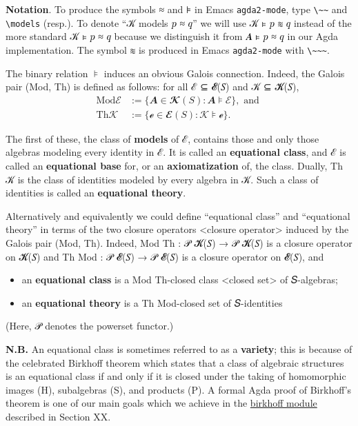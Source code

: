 \documentclass[sigplan,screen]{acmart}
\newcommand\birkhoffmodule{\href{https://gitlab.com/ualib/ualib.gitlab.io/-/blob/master/birkhoff.lagda.rst}{birkhoff module}\xspace}
\begin{document}
\noindent \textbf{Notation}. To produce the symbols ≈ and ⊧ in Emacs \texttt{agda2-mode}, type \texttt{\textbackslash{}\textasciitilde{}\textasciitilde{}} and \texttt{\textbackslash{}models} (resp.). To denote ``𝒦 models 𝑝 ≈ 𝑞'' we will use 𝒦 ⊧ 𝑝 ≋ 𝑞 instead of the more standard 𝒦 ⊧ 𝑝 ≈ 𝑞 because we distinguish it from 𝑨 ⊧ 𝑝 ≈ 𝑞 in our Agda implementation. The symbol ≋ is produced in Emacs \texttt{agda2-mode} with \texttt{\textbackslash{}\textasciitilde{}\textasciitilde{}\textasciitilde{}}.

The binary relation \(⊧\) induces an obvious Galois connection. Indeed, the Galois pair (Mod, Th) is defined as follows: for all ℰ ⊆ 𝓔(𝑆) and 𝒦 ⊆ 𝓚(𝑆),
\begin{align*}
\mathrm{Mod} ℰ &:= \{ 𝑨 ∈ 𝓚(𝑆) : 𝑨 ⊧ ℰ \}, \text{ and }\\
\mathrm{Th} 𝒦 &:= \{ℯ ∈ 𝓔(𝑆) : 𝒦 ⊧ ℯ \}.
\end{align*}

The first of these, the class of \textbf{models} of ℰ, contains those and only those algebras modeling every identity in ℰ. It is called an \textbf{equational class}, and ℰ is called an \textbf{equational base} for, or an \textbf{axiomatization} of, the class. Dually, Th 𝒦 is the class of identities modeled by every algebra in 𝒦. Such a class of identities is called an \textbf{equational theory}.

Alternatively and equivalently we could define ``equational class'' and ``equational theory'' in terms of the two
closure operators \textless{}closure operator\textgreater{} induced by the Galois pair (Mod, Th). Indeed, Mod Th : 𝒫 𝓚(𝑆) → 𝒫 𝓚(𝑆) is a closure operator on 𝓚(𝑆) and Th Mod : 𝒫 𝓔(𝑆) → 𝒫 𝓔(𝑆) is a closure operator on 𝓔(𝑆), and

\begin{itemize}
\item an \textbf{equational class} is a Mod Th-closed class \textless{}closed set\textgreater{} of 𝑆-algebras;
\item an \textbf{equational theory} is a Th Mod-closed set of 𝑆-identities
\end{itemize}
(Here, 𝒫 denotes the powerset functor.)

\noindent \textbf{N.B.} An equational class is sometimes referred to as a \textbf{variety}; this is because of the celebrated Birkhoff theorem which states that a class of algebraic structures is an equational class if and only if it is closed under the taking of homomorphic images (H), subalgebras (S), and products (P). A formal Agda proof of Birkhoff's theorem is one of our main goals which we achieve in the \birkhoffmodule described in Section XX.
\end{document}
